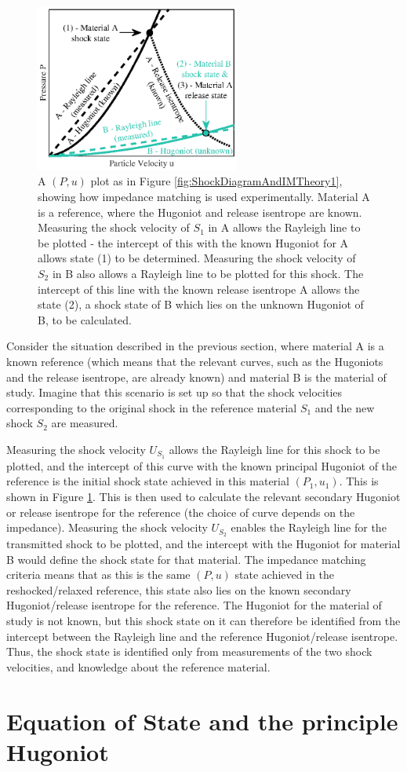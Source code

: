 \begin{figure}
\centering
\includegraphics[width=0.6\textwidth]{figures/Theory/MatlabIM2.eps}%
\caption{\label{fig:IMTheory2} A $(P,u)$ plot as in Figure \ref{fig:ShockDiagramAndIMTheory1}, showing how impedance matching is used experimentally. Material A is a reference, where the Hugoniot and release isentrope are known. Measuring the shock velocity of $S_1$ in A allows the Rayleigh line to be plotted - the intercept of this with the known Hugoniot for A allows state (1) to be determined. Measuring the shock velocity of $S_2$ in B also allows a Rayleigh line to be plotted for this shock. The intercept of this line with the known release isentrope A allows the state (2), a shock state of B which lies on the unknown Hugoniot of B, to be calculated.}
\end{figure}

Consider the situation described in the previous section, where material A is a known reference (which means that the relevant curves, such as the Hugoniots and the release isentrope, are already known) and material B is the material of study. Imagine that this scenario is set up so that the shock velocities corresponding to the original shock in the reference material $S_1$ and the new shock $S_2$ are measured.

Measuring the shock velocity $U_{S_1}$ allows the Rayleigh line for this shock to be plotted, and the intercept of this curve with the known principal Hugoniot of the reference is the initial shock state achieved in this material $(P_1, u_1)$. This is shown in Figure \ref{fig:IMTheory2}. This is then used to calculate the relevant secondary Hugoniot or release isentrope for the reference (the choice of curve depends on the impedance). Measuring the shock velocity $U_{S_2}$ enables the Rayleigh line for the transmitted shock to be plotted, and the intercept with the Hugoniot for material B would define the shock state for that material. The impedance matching criteria means that as this is the same $(P, u)$ state achieved in the reshocked/relaxed reference, this state also lies on the known secondary Hugoniot/release isentrope for the reference. The Hugoniot for the material of study is not known, but this shock state on it can therefore be identified from the intercept between the Rayleigh line and the reference Hugoniot/release isentrope. Thus, the shock state is identified only from measurements of the two shock velocities, and knowledge about the reference material.

\section{Equation of State and the principle Hugoniot}